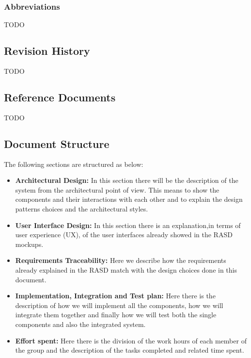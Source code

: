 \documentclass[titlepage]{article}
\begin{document}
\subsubsection{Abbreviations}
TODO
\subsection{Revision History}
TODO
\subsection{Reference Documents}
TODO
\subsection{Document Structure}
The following sections are structured as below:
\begin{itemize}
	\item \textbf{Architectural Design: }In this section there will be the description of the system from the architectural point of view. This means to show the components and their interactions with each other and to explain the design patterns choices and the architectural styles. 
	\item \textbf{User Interface Design:} In this section there is an explanation,in terms of user experience (UX), of the user interfaces already showed in the RASD mockups.
	\item \textbf{Requirements Traceability:} Here we describe how the requirements already explained in the RASD match with the design choices done in this document.
	\item \textbf{Implementation, Integration and Test plan:} Here there is the description of how we will implement all the components, how we will integrate them together and finally how we will test both the single components and also the integrated system.
	\item \textbf{Effort spent:} Here there is the division of the work hours of each member of the group and the description of the tasks completed and related time spent.
\end{itemize}
\end{document}
